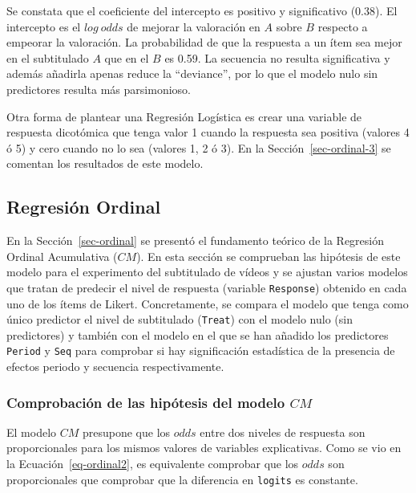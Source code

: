 \documentclass[
  12pt,
  a4paper,
  extrafontsizes,
  onecolumn,
  openright,
  table]{memoir}
\begin{document}
\normalsize

Se constata que el coeficiente del intercepto es positivo y
significativo (0.38). El intercepto es el \(log\ odds\) de mejorar la
valoración en \(A\) sobre \(B\) respecto a empeorar la valoración. La
probabilidad de que la respuesta a un ítem sea mejor en el subtitulado
\(A\) que en el \(B\) es 0.59. La secuencia no resulta significativa y
además añadirla apenas reduce la \enquote{deviance}, por lo que el
modelo nulo sin predictores resulta más parsimonioso.

Otra forma de plantear una Regresión Logística es crear una variable de
respuesta dicotómica que tenga valor 1 cuando la respuesta sea positiva
(valores 4 ó 5) y cero cuando no lo sea (valores 1, 2 ó 3). En la
Sección~\ref{sec-ordinal-3} se comentan los resultados de este modelo.

\hypertarget{sec-ordinal-2}{%
\subsection{Regresión Ordinal}\label{sec-ordinal-2}}

En la Sección~\ref{sec-ordinal} se presentó el fundamento teórico de la
Regresión Ordinal Acumulativa (\(CM\)). En esta sección se comprueban
las hipótesis de este modelo para el experimento del subtitulado de
vídeos y se ajustan varios modelos que tratan de predecir el nivel de
respuesta (variable \texttt{Response}) obtenido en cada uno de los ítems
de Likert. Concretamente, se compara el modelo que tenga como único
predictor el nivel de subtitulado (\texttt{Treat}) con el modelo nulo
(sin predictores) y también con el modelo en el que se han añadido los
predictores \texttt{Period} y \texttt{Seq} para comprobar si hay
significación estadística de la presencia de efectos periodo y secuencia
respectivamente.

\hypertarget{comprobaciuxf3n-de-las-hipuxf3tesis-del-modelo-cm}{%
\subsubsection{\texorpdfstring{Comprobación de las hipótesis del modelo
\(CM\)}{Comprobación de las hipótesis del modelo CM}}\label{comprobaciuxf3n-de-las-hipuxf3tesis-del-modelo-cm}}

El modelo \(CM\) presupone que los \(odds\) entre dos niveles de
respuesta son proporcionales para los mismos valores de variables
explicativas. Como se vio en la Ecuación~\ref{eq-ordinal2}, es
equivalente comprobar que los \(odds\) son proporcionales que comprobar
que la diferencia en \texttt{logits} es constante.
\end{document}
